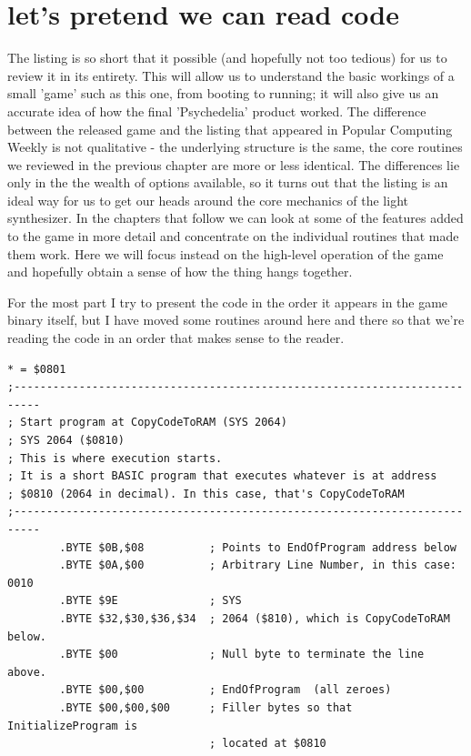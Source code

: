 \chapter{let's pretend we can read code} 
\label{sec:commentary}
\rhead[]{\leftmark}
\lstset{style=6502Style}
The listing is so short that it possible (and hopefully not too tedious) for us to
review it in its entirety. This will allow us to understand the basic workings of 
a small 'game' such as this one, from booting to running; it will also give us an
accurate idea of how the final 'Psychedelia' product worked. The difference between
the released game and the listing that appeared in Popular Computing Weekly is not
qualitative - the underlying structure is the same, the core routines we reviewed 
in the previous chapter are more or less identical. The differences lie only in the
the wealth of options available, so it turns out that the listing is an ideal way
for us to get our heads around the core mechanics of the light synthesizer. In the
chapters that follow we can look at some of the features added to the game in more
detail and concentrate on the individual routines that made them work. Here we will
focus instead on the high-level operation of the game and hopefully obtain a sense
of how the thing hangs together.

For the most part I try to present the code in the order it appears in the game
binary itself, but I have moved some routines around here and there so that we're
reading the code in an order that makes sense to the reader.

\clearpage
\begin{lstlisting}[caption=The bootstrap routine common to nearly every C64 program]
* = $0801
;--------------------------------------------------------------------------
; Start program at CopyCodeToRAM (SYS 2064)
; SYS 2064 ($0810)
; This is where execution starts.
; It is a short BASIC program that executes whatever is at address
; $0810 (2064 in decimal). In this case, that's CopyCodeToRAM
;--------------------------------------------------------------------------
        .BYTE $0B,$08          ; Points to EndOfProgram address below
        .BYTE $0A,$00          ; Arbitrary Line Number, in this case: 0010
        .BYTE $9E              ; SYS
        .BYTE $32,$30,$36,$34  ; 2064 ($810), which is CopyCodeToRAM below.
        .BYTE $00              ; Null byte to terminate the line above.
        .BYTE $00,$00          ; EndOfProgram  (all zeroes)
        .BYTE $00,$00,$00      ; Filler bytes so that InitializeProgram is
                               ; located at $0810
\end{lstlisting}

